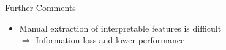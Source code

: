 \documentclass[10pt,compress,t,notes=noshow, xcolor=table]{beamer}
\begin{document}
\begin{frame}{Further Comments}
\begin{itemize}
\begin{itemize}
    \item Manual extraction of interpretable features is difficult \\$\Rightarrow$ Information loss and lower performance
\end{itemize}
    \end{itemize}
    
    

\end{frame}
\end{document}

